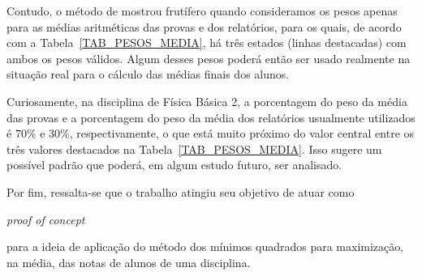 \documentclass[11pt]{article}
\begin{document}
                Contudo, o método de mostrou frutífero
                quando consideramos os pesos apenas para as
                médias aritméticas das provas e dos
                relatórios, para os quais, de acordo com a
                Tabela~\ref{TAB_PESOS_MEDIA}, há três
                estados (linhas destacadas) com ambos os
                pesos válidos. Algum desses pesos poderá então
                ser usado realmente na situação real para
                o cálculo das médias finais dos alunos.

                Curiosamente, na disciplina de Física
                Básica 2, a porcentagem do peso da média
                das provas e a porcentagem do peso da
                média dos relatórios usualmente utilizados é
                $70\%$ e $30\%$, respectivamente, o que está
                muito próximo do valor central entre os três
                valores destacados na
                Tabela~\ref{TAB_PESOS_MEDIA}. Isso sugere
                um possível padrão que poderá, em algum
                estudo futuro, ser analisado.

                Por fim, ressalta-se que o trabalho atingiu seu
                objetivo de atuar como
                \begin{otherlanguage}{english}
                        \textit{proof of concept}
                \end{otherlanguage}
                para a ideia de aplicação do método dos
                mínimos quadrados para maximização, na média,
                das notas de alunos de uma disciplina.
        \printbibliography
\end{document}
